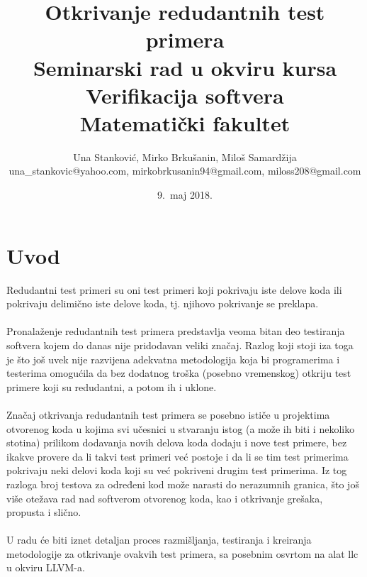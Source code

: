 \documentclass[a4paper]{article}
\begin{document}
\title{Otkrivanje redudantnih test primera\\ \small{Seminarski rad u okviru kursa\\Verifikacija softvera\\ Matematički fakultet}}

\author{Una Stanković, Mirko Brkušanin, Miloš Samardžija\\ una\_stankovic@yahoo.com, mirkobrkusanin94@gmail.com, miloss208@gmail.com}
\date{9.~maj 2018.}
\maketitle


\tableofcontents

\newpage

\section{Uvod}
\label{sec:introduction}
Redudantni test primeri su oni test primeri koji pokrivaju iste delove koda ili pokrivaju delimično iste delove koda, tj. njihovo pokrivanje se preklapa.\\\\
Pronalaženje redudantnih test primera predstavlja veoma bitan deo testiranja softvera kojem do danas nije pridodavan veliki značaj. Razlog koji stoji iza toga je što još uvek nije razvijena adekvatna metodologija koja bi programerima i testerima omogućila da bez dodatnog troška (posebno vremenskog) otkriju test primere koji su redudantni, a potom ih i uklone.\\\\
Značaj otkrivanja redudantnih test primera se posebno ističe u projektima otvorenog koda u kojima svi učesnici u stvaranju istog (a može ih biti i nekoliko stotina) prilikom dodavanja novih delova koda dodaju i nove test primere, bez ikakve provere da li takvi test primeri već postoje i da li se tim test primerima pokrivaju neki delovi koda koji su već pokriveni drugim test primerima. Iz tog razloga broj testova za određeni kod može narasti do nerazumnih granica, što još više otežava rad nad softverom otvorenog koda, kao i otkrivanje grešaka, propusta i slično. \\\\
U radu će biti iznet detaljan proces razmišljanja, testiranja i kreiranja metodologije za otkrivanje ovakvih test primera, sa posebnim osvrtom na alat llc u okviru LLVM-a. 
\end{document}
